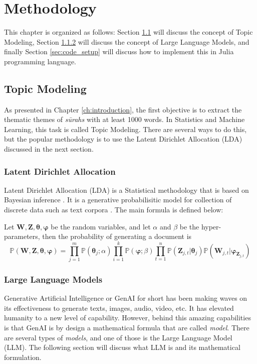 \chapter{Methodology}
This chapter is organized as follows: Section \ref{sec:topic_modeling_method} will discuss the concept of Topic Modeling, Section \ref{sec:llm_method} will discuss the concept of Large Language Models, and finally Section \ref{sec:code_setup} will discuss how to implement this in Julia programming language.
\section{Topic Modeling}\label{sec:topic_modeling_method}
As presented in Chapter \ref{ch:introduction}, the first objective is to extract the thematic themes of \textit{s\=urahs}  with at least 1000 words. In Statistics and Machine Learning, this task is called Topic Modeling. There are several ways to do this, but the popular methodology is to use the Latent Dirichlet Allocation (LDA) discussed in the next section.
\subsection{Latent Dirichlet Allocation}\label{sec:lda}
Latent Dirichlet Allocation (LDA) is a Statistical methodology that is based on Bayesian inference \cite{bayes,laplace1986}. It is a generative probabilisitic model for collection of discrete data such as text corpora \cite{blei2003latent}. The main formula is defined below:
\begin{defnx}
Let $\mathbf{W},\mathbf{Z},\boldsymbol{\theta},\boldsymbol{\varphi}$ be the random variables, and let $\alpha$ and $\beta$ be the hyper-parameters, then the probability of generating a document is
\begin{equation}
    \mathbb{P}(\mathbf{W},\mathbf{Z},\boldsymbol{\theta},\boldsymbol{\varphi})=\prod_{j=1}^m\mathbb{P}(\boldsymbol{\theta}_j;\alpha)\prod_{i=1}^{k}\mathbb{P}(\boldsymbol{\varphi};\beta)\prod_{t=1}^{n}\mathbb{P}(\mathbf{Z}_{j,t}|\boldsymbol{\theta}_j)\mathbb{P}(\mathbf{W}_{j,t}|\boldsymbol{\varphi}_{\mathbf{Z}_{j,t}})
\end{equation}
\end{defnx}
\subsection{Large Language Models}\label{sec:llm_method}
Generative Artificial Intelligence or GenAI for short has been making waves on its effectiveness to generate texts, images, audio, video, etc. It has elevated humanity to a new level of capability. However, behind this amazing capabilities is that GenAI is by design a mathematical formula that are called \textit{model}. There are several types of \textit{models}, and one of those is the Large Language Model (LLM). The following section will discuss what LLM is and its mathematical formulation.
